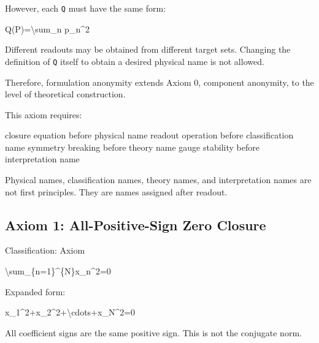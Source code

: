 \documentclass[
  a4paper]{article}
\newenvironment{Shaded}{}{}
\newcommand{\NormalTok}[1]{#1}
\begin{document}
However, each \texttt{Q} must have the same form:

\begin{Shaded}
\begin{Highlighting}[]
\NormalTok{Q(P)=\textbackslash{}sum\_n p\_n\^{}2}
\end{Highlighting}
\end{Shaded}

Different readouts may be obtained from different target sets. Changing
the definition of \texttt{Q} itself to obtain a desired physical name is
not allowed.

Therefore, formulation anonymity extends Axiom 0, component anonymity,
to the level of theoretical construction.

This axiom requires:

\begin{Shaded}
\begin{Highlighting}[]
\NormalTok{closure equation before physical name}
\NormalTok{readout operation before classification name}
\NormalTok{symmetry breaking before theory name}
\NormalTok{gauge stability before interpretation name}
\end{Highlighting}
\end{Shaded}

Physical names, classification names, theory names, and interpretation
names are not first principles. They are names assigned after readout.

\subsection{Axiom 1: All-Positive-Sign Zero
Closure}\label{axiom-1-all-positive-sign-zero-closure}

Classification: Axiom

\begin{Shaded}
\begin{Highlighting}[]
\NormalTok{\textbackslash{}sum\_\{n=1\}\^{}\{N\}x\_n\^{}2=0}
\end{Highlighting}
\end{Shaded}

Expanded form:

\begin{Shaded}
\begin{Highlighting}[]
\NormalTok{x\_1\^{}2+x\_2\^{}2+\textbackslash{}cdots+x\_N\^{}2=0}
\end{Highlighting}
\end{Shaded}

All coefficient signs are the same positive sign. This is not the
conjugate norm.
\end{document}
